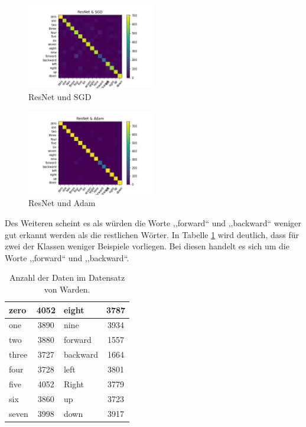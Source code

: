 \documentclass[sigconf]{acmart}
\begin{document}
\newpage
\begin{figure}[ht]
  \includegraphics[width=0.5\textwidth]{images/Confusion-Matrix_ResNet_SGD}
  \caption{ResNet und SGD}
  \Description{}
  \label{fig:Confusion-Matrix_ResNet_SGD}
\end{figure} 

\begin{figure}[ht]
  \includegraphics[width=0.5\textwidth]{images/Confusion-Matrix_ResNet_Adam}
  \caption{ResNet und Adam}
  \Description{}
  \label{fig:Confusion-Matrix_ResNet_Adam}
\end{figure} 

\noindent Des Weiteren scheint es als würden die Worte ,,forward“ und ,,backward“ weniger gut erkannt werden als die restlichen Wörter. In Tabelle \ref{table:data} wird deutlich, dass für zwei der Klassen weniger Beispiele vorliegen. Bei diesen handelt es sich um die Worte ,,forward“ und ,,backward“.
\newline
\newline

\begin{table}[ht]
\centering
\begin{tabular}{|l|c|l|c|}
\hline
zero & 4052 & eight & 3787  \\
\hline
one & 3890 & nine & 3934  \\
\hline
two & 3880 & forward & 1557  \\
\hline
three &  3727 & backward & 1664 \\
\hline
four & 3728 & left & 3801 \\
\hline
five & 4052 & Right & 3779\\
\hline
six & 3860 & up & 3723\\
\hline
seven & 3998 & down & 3917\\
\hline
\end{tabular}
\caption{Anzahl der Daten im Datensatz von Warden\cite{speechcommandsv2}.}
\label{table:data}
\end{table}
\end{document}
